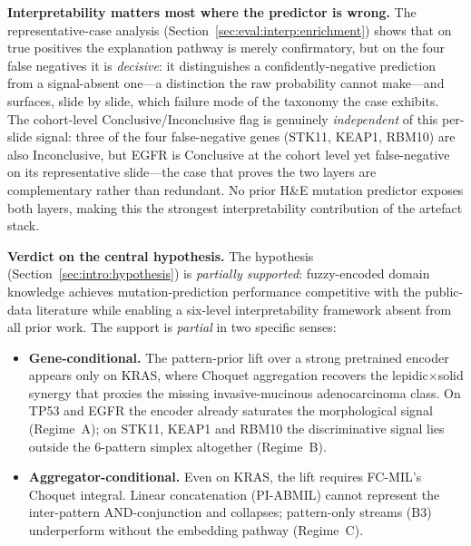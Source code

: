 \textbf{Interpretability matters most where the predictor is
wrong.}
The representative-case analysis
(Section~\ref{sec:eval:interp:enrichment}) shows that on true
positives the explanation pathway is merely confirmatory, but on
the four false negatives it is \emph{decisive}: it distinguishes
a confidently-negative prediction from a signal-absent one---a
distinction the raw probability cannot make---and surfaces, slide
by slide, which failure mode of the taxonomy the case exhibits.
The cohort-level Conclusive/Inconclusive flag is genuinely
\emph{independent} of this per-slide signal: three of the four
false-negative genes (STK11, KEAP1, RBM10) are also Inconclusive,
but EGFR is Conclusive at the cohort level yet false-negative on
its representative slide---the case that proves the two layers
are complementary rather than redundant.
No prior H\&E mutation predictor exposes both layers, making this
the strongest interpretability contribution of the artefact
stack.

\textbf{Verdict on the central hypothesis.}
The hypothesis (Section~\ref{sec:intro:hypothesis}) is
\emph{partially supported}: fuzzy-encoded domain knowledge
achieves mutation-prediction performance competitive with the
public-data literature while enabling a six-level
interpretability framework absent from all prior work.
The support is \emph{partial} in two specific senses:
\begin{itemize}
    \item \textbf{Gene-conditional.}
    The pattern-prior lift over a strong pretrained encoder
    appears only on KRAS, where Choquet aggregation recovers
    the lepidic$\times$solid synergy that proxies the missing
    invasive-mucinous adenocarcinoma class.
    On TP53 and EGFR the encoder already saturates the
    morphological signal (Regime~A); on STK11, KEAP1 and
    RBM10 the discriminative signal lies outside the
    6-pattern simplex altogether (Regime~B).
    \item \textbf{Aggregator-conditional.}
    Even on KRAS, the lift requires FC-MIL's Choquet integral.
    Linear concatenation (PI-ABMIL) cannot represent the
    inter-pattern AND-conjunction and collapses; pattern-only
    streams (B3) underperform without the embedding pathway
    (Regime~C).
\end{itemize}

